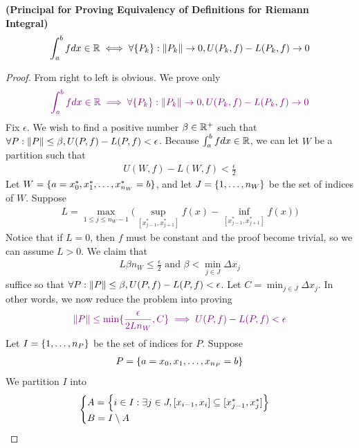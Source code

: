 \documentclass{report}
\begin{document}
\begin{theorem}
\label{1}
\textbf{(Principal for Proving Equivalency of Definitions for Riemann Integral)} 
\begin{align*}
\int_a^b fdx\in\mathbb{R} \iff  \forall \{ P_k \} : \| P_k \|\to 0, U(P_k,f)-L(P_k,f)\to 0
\end{align*}
\end{theorem}
\begin{proof}
From right to left is obvious. We prove only 
\begin{align*}
  \textcolor{violet}{\int_a^b fdx\in\mathbb{R} \implies   \forall \{ P_k \} : \| P_k \|\to 0, U(P_k,f)-L(P_k,f)\to 0}
\end{align*}
Fix $\epsilon $. We wish to find a positive number $\beta \in\mathbb{R}^+$ such that $\forall P: \| P \|\leq \beta , U(P,f)-L(P,f)<\epsilon $. Because $\int_a^b fdx \in\mathbb{R}$, we can let $W$ be a partition such that 
\begin{align*}
U(W,f)-L(W,f)<\frac{\epsilon}{2}
\end{align*}
Let $W=\{ a=x_0^*,x_1^*,\dots ,x_{n_W}^*=b \}$, and let $J=\{ 1,\dots ,n_W \}$ be the set of indices of $W$. Suppose
\begin{align}
\label{e1}
L= \max_{1\leq j\leq n_W-1} \big(\sup_{[x_{j-1}^*,x_{j+1}^*]} f(x)- \inf_{[x_{j-1}^*,x_{j+1}^*]} f(x) \big)
\end{align}
Notice that if $L=0$, then  $f$ must be constant and the proof become trivial, so we can assume $L>0$. We claim that 
\begin{align*}
L\beta n_W\leq \frac{\epsilon}{2}\text{ and }\beta < \min_{j \in J}\Delta x_j
\end{align*}
suffice so that $\forall P:\| P \|\leq \beta , U(P,f)-L(P,f)<\epsilon $. Let $C= \min_{j \in J}\Delta x_j$. In other words, we now reduce the problem into proving 
\begin{align*}
  \textcolor{violet}{ \| P \| \leq \min \{ \frac{\epsilon }{2Ln_W },C \} \implies U(P,f)-L(P,f)<\epsilon }
\end{align*}
Let $I=\{ 1,\dots , n_P \}$ be the set of indices for $P$. Suppose 
\begin{align*}
P=\{ a=x_0,x_1,\dots ,x_{n_P}=b \}
\end{align*}
We partition $I$ into 
\begin{align*}
\begin{cases}
  A=\Big\{ i \in I : \exists j \in J,  [x_{i-1},x_i]\subseteq [x_{j-1}^*,x_j^*] \Big\}\\
  B=I \setminus  A
\end{cases}
\end{align*}

\end{proof}
\end{document}
